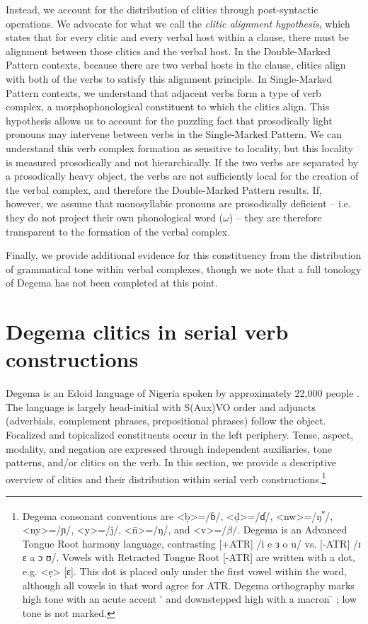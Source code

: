 \documentclass[output=paper]{langsci/langscibook}
\begin{document}
Instead, we account for the distribution of clitics through post-syntactic operations. We advocate for what we call the \textit{clitic alignment hypothesis}, which states that for every clitic and every verbal host within a clause, there must be alignment between those clitics and the verbal host. In the Double-Marked Pattern contexts, because there are two verbal hosts in the clause, clitics align with both of the verbs to satisfy this alignment principle. In Single-Marked Pattern contexts, we understand that adjacent verbs form a type of verb complex, a morphophonological constituent to which the clitics align. This hypothesis allows us to account for the puzzling fact that prosodically light pronouns may intervene between verbs in the Single-Marked Pattern. We can understand this verb complex formation as sensitive to locality, but this locality is measured prosodically and not hierarchically. If the two verbs are separated by a prosodically heavy object, the verbs are not sufficiently local for the creation of the verbal complex, and therefore the Double-Marked Pattern results. If, however, we assume that monosyllabic pronouns are prosodically deficient – i.e. they do not project their own phonological word ($\omega $) – they are therefore transparent to the formation of the verbal complex. 

Finally, we provide additional evidence for this constituency from the distribution of grammatical tone within verbal complexes, though we note that a full tonology of Degema has not been completed at this point. 

\chapter{Degema clitics in serial verb constructions}

Degema is an Edoid language of Nigeria spoken by approximately 22,000 people \citep[5]{Kari2004}. The language is largely head-initial with S(Aux)VO order and adjuncts (adverbials, complement phrases, prepositional phrases) follow the object. Focalized and topicalized constituents occur in the left periphery. Tense, aspect, modality, and negation are expressed through independent auxiliaries, tone patterns, and/or clitics on the verb. In this section, we provide a descriptive overview of clitics and their distribution within serial verb constructions.\footnote{Degema consonant conventions are {\textless}ḅ{\textgreater}=/ɓ/, {\textless}ḍ{\textgreater}=/ɗ/, {\textless}nw{\textgreater}=/ŋ\textsuperscript{ʷ}/, {\textless}ny{\textgreater}=/ɲ/, {\textless}y{\textgreater}=/j/, {\textless}\={n}{\textgreater}=/ŋ/, and {\textless}v{\textgreater}=/$\beta $/. Degema is an Advanced Tongue Root harmony language, contrasting [+ATR] /i e ɜ o u/ vs. [-ATR] /ɪ ɛ a ɔ ʊ/. Vowels with Retracted Tongue Root [-ATR] are written with a dot, e.g. {\textless}ẹ{\textgreater} [ɛ]. This dot is placed only under the first vowel within the word, although all vowels in that word agree for ATR. Degema orthography marks high tone with an acute accent  \'{ } and downstepped high with a macron  \={ } ; low tone is not marked.
} 
\end{document}
